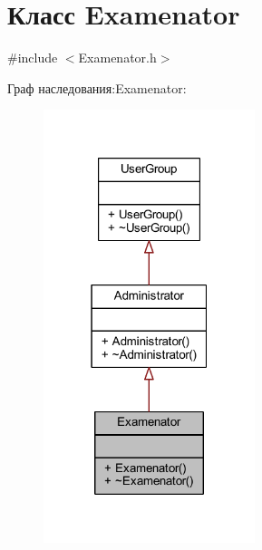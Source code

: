 \hypertarget{class_examenator}{}\section{Класс Examenator}
\label{class_examenator}


{\ttfamily \#include $<$Examenator.\+h$>$}



Граф наследования\+:Examenator\+:\nopagebreak
\begin{figure}[H]
\begin{center}
\leavevmode
\includegraphics[width=175pt]{d2/db4/class_examenator__inherit__graph}
\end{center}
\end{figure}


